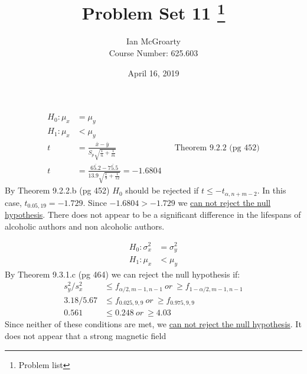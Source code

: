 \documentclass[12pt]{article}
\title{Problem Set 11 \thanks{Problem list }}
\author{Ian McGroarty \\
	Course Number: 625.603}
\date{April 16, 2019}
\newenvironment{problem}[2][Problem]{\begin{trivlist}
\item[\hskip \labelsep {\bfseries #1}\hskip \labelsep {\bfseries #2.}]}{\end{trivlist}}
\begin{document}
\maketitle
\newpage
\begin{problem}{9.2.6} 
	\begin{align*}
		H_0: \mu_x &= \mu_y \\
		H_1: \mu_x &< \mu_y  \\
	t&= \frac{\bar{x} - \bar{y}}{S_p\sqrt{\frac{1}{n} + \frac{1}{m}}} && \text{Theorem 9.2.2 (pg 452)} \\
	t&= \frac{\bar{65.2} - \bar{75.5}}{13.9\sqrt{\frac{1}{9} + \frac{1}{12}}} = -1.6804 
	\end{align*}
By Theorem 9.2.2.b (pg 452) $H_0$ should be rejected if $t\leq -t_{\alpha , n+m-2}$. In this case, $t_{0.05,19} = -1.729$. Since $-1.6804 > -1.729 $ we \underline{can not reject the null hypothesis}. There does not appear to be a significant difference in the lifespans of alcoholic authors and non alcoholic authors. 
\end{problem}

\begin{problem}{9.3.4}
	\begin{align*}
		H_0: \sigma^2_x &= \sigma^2_y \\
		H_1: \mu_x &< \mu_y  
	\end{align*}
By Theorem 9.3.1.c (pg 464) we can reject the null hypothesis if: 
\begin{align*}
s^2_y/s^2_x &\leq f_{\alpha /2, m-1,n-1} \ or \  \geq  f_{1-\alpha /2, m-1,n-1}\\
3.18/5.67 & \leq f_{0.025,9,9} \  or \ \geq f_{0.975,9,9} \\
0.561& \leq 0.248 \ or \ \geq 4.03
\end{align*}
Since neither of these conditions are met, we \underline{can not reject the null hypothesis}. It does not appear that a strong magnetic field 
\end{problem}
\end{document}
